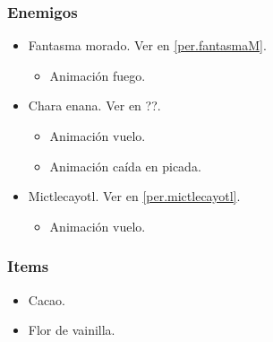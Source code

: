 \documentclass[11pt,letterpaper]{article}
\begin{document}
\begin{itemize}
        \subsubsection{Enemigos}
\begin{itemize}
        \item Fantasma morado. Ver en \ref{per.fantasmaM}.
        \begin{itemize}
				\item Animación fuego.
		\end{itemize}
        \item Chara enana. Ver en ??.
        \begin{itemize}
				\item Animación vuelo.
				\item Animación caída en picada.
		\end{itemize}
		\item Mictlecayotl. Ver en \ref{per.mictlecayotl}.
\begin{itemize}
        \item   Animación vuelo.
\end{itemize}			
\end{itemize}
        \subsubsection{Items}
\begin{itemize}
        \item Cacao.
        \item Flor de vainilla.
\end{itemize}

\end{itemize}
\end{document}
